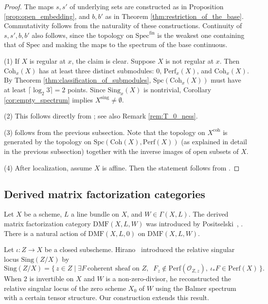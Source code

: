 \documentclass[11pt]{amsart}
\theoremstyle{definition}
\theoremstyle{plain}
\theoremstyle{remark}
\newcommand{\perf}{\mathrm{Perf}}
\newcommand{\coh}{{\mathrm{Coh}}}
\newcommand{\Spec}{\mathrm{Spec}}
\newcommand{\mo}{\mathrm}
\newcommand{\sO}{\mathscr{O}}
\newcommand{\Sing}{\mathrm{Sing}}
\newcommand{\Spc}{\mathrm{Spc}}
\numberwithin{equation}{section}
\begin{document}
\begin{proof}
The maps \(s,s'\) of underlying sets are constructed as in Proposition \ref{prop:open_embedding}, and \(b,b'\) as in Theorem \ref{thm:restriction_of_the_base}.  
Commutativity follows from the naturality of these constructions.  
Continuity of \(s,s',b,b'\) also follows, since the topology on \(\Spec^{\mo{fin}}\) is the weakest one containing that of \(\Spec\) and making the maps to the spectrum of the base continuous.


(1) If \(X\) is regular at \(x\), the claim is clear.
Suppose \(X\) is not regular at \(x\).
Then \(\coh_x(X)\) has at least three distinct submodules: \(0\), \(\perf_x(X)\), and \(\coh_x(X)\).
By Theorem \ref{thm:classification_of_submodules}, \(\Spc(\coh_x(X))\) must have at least \(\lceil\log_2 3\rceil=2\) points.
Since \(\Sing_x(X)\) is nontrivial, Corollary \ref{cor:empty_spectrum} implies \(X^{\mo{sing}}\neq\emptyset\).

(2) This follows directly from \cite{Po}; see also Remark \ref{rem:T_0_ness}.

(3) follows from the previous subsection.  
Note that the topology on \(X^{\mo{coh}}\) is generated by the topology on \(\Spc(\coh(X),\perf(X))\) (as explained in detail in the previous subsection) together with the inverse images of open subsets of \(X\).

(4) After localization, assume \(X\) is affine.
Then the statement follows from \cite[Corollary 3.8]{Ma1}.
\end{proof}


\subsection{Derived matrix factorization categories}

Let \(X\) be a scheme, \(L\) a line bundle on \(X\), and \(W \in \Gamma(X, L)\).
The derived matrix factorization category \(\mathrm{DMF}(X, L, W)\) was introduced by Positselski~\cite{Pos}, \cite{EP}.  
There is a natural action of \(\mathrm{DMF}(X, L, 0)\) on \(\mathrm{DMF}(X, L, W)\).  

Let \(\iota:Z \to X\) be a closed subscheme.  
Hirano~\cite{Hi} introduced the relative singular locus \(\mathrm{Sing}(Z/X)\) by
\[
\mathrm{Sing}(Z/X)
= \{\, z\in Z \mid \exists F\ \text{coherent sheaf on } Z, \;\;
F_z\notin\perf(\sO_{Z,z}),\ \iota_*F\in\perf(X)\,\}.
\]
When \(2\) is invertible on \(X\) and \(W\) is a non-zero-divisor, he reconstructed the relative singular locus of the zero scheme \(X_0\) of \(W\) using the Balmer spectrum with a certain tensor structure.  
Our construction extends this result.
\end{document}
